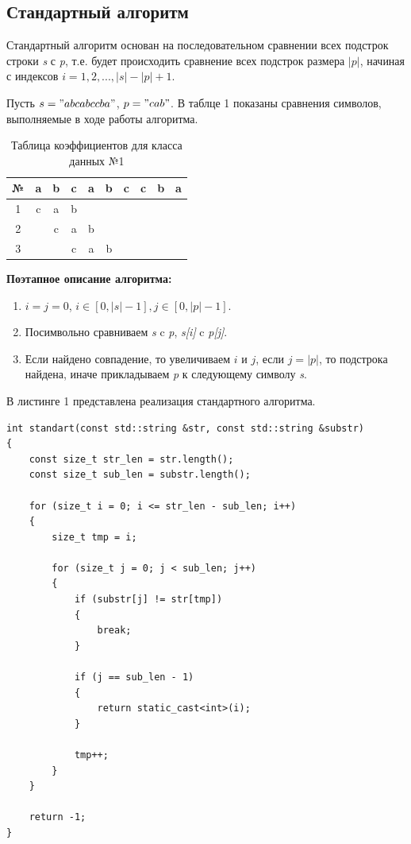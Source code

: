 \documentclass[12pt]{report}
\begin{document}
\subsection{Стандартный алгоритм}
Стандартный алгоритм основан на последовательном сравнении всех подстрок строки \textit{s} с \textit{p}, т.е. будет происходить сравнение всех подстрок размера $|p|$, начиная с индексов $i = 1,2,...,|s|-|p|+1$.

Пусть $s= "abcabccba"$, $p = "cab"$. В таблце 1 показаны сравнения символов, выполняемые в ходе работы алгоритма.
\begin{table}[h]
	\caption{Таблица коэффициентов для класса данных №1}
	\begin{center}
		\begin{tabular}{|c|c|c|c|c|c|c|c|c|c|}
			\hline
			№&a&b&c&a&b&c&c&b&a\\
			\hline	    			
			1&c&a&b& & & & & &\\
			\hline	    			
			2& &c&a&b& & & & &\\
			\hline	    			
			3& & &c&a&b& & & &\\
			\hline	    			
		\end{tabular}
		\label{T:t1}	
	\end{center}
\end{table}

\textbf{Поэтапное описание алгоритма:}
\begin{enumerate}
	\item $i = j = 0$, $i \in [0, |s|-1], j \in [0, |p| - 1]$.
	\item Посимвольно сравниваем \textit{s} c \textit{p}, \textit{s[i]} c \textit{p[j]}.
	\item Если найдено совпадение, то увеличиваем $i$ и $j$, если $j=|p|$, то подстрока найдена, иначе прикладываем \textit{p} к следующему символу \textit{s}.
\end{enumerate}

В листинге 1 представлена реализация стандартного алгоритма.
\begin{lstlisting}[frame=single,caption=Стандартный алгоритм, breaklines]
int standart(const std::string &str, const std::string &substr)
{
	const size_t str_len = str.length();
	const size_t sub_len = substr.length();
	
	for (size_t i = 0; i <= str_len - sub_len; i++)
	{
		size_t tmp = i;
		
		for (size_t j = 0; j < sub_len; j++)
		{
			if (substr[j] != str[tmp])
			{
				break;
			}
			
			if (j == sub_len - 1)
			{
				return static_cast<int>(i);
			}
			
			tmp++;
		}
	}
	
	return -1;
}
\end{lstlisting}
\end{document}
